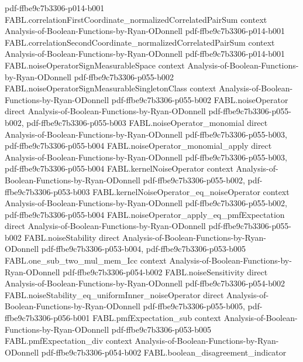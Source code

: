 \begin{theorem}
  {pdf-ffbe9c7b3306-p014-b001}
\proofstep
  {FABL.correlationFirstCoordinate_normalizedCorrelatedPairSum}
  {context}
  {Analysis-of-Boolean-Functions-by-Ryan-ODonnell}
  {pdf-ffbe9c7b3306-p014-b001}
\proofstep
  {FABL.correlationSecondCoordinate_normalizedCorrelatedPairSum}
  {context}
  {Analysis-of-Boolean-Functions-by-Ryan-ODonnell}
  {pdf-ffbe9c7b3306-p014-b001}
\proofstep
  {FABL.noiseOperatorSignMeasurableSpace}
  {context}
  {Analysis-of-Boolean-Functions-by-Ryan-ODonnell}
  {pdf-ffbe9c7b3306-p055-b002}
\proofstep
  {FABL.noiseOperatorSignMeasurableSingletonClass}
  {context}
  {Analysis-of-Boolean-Functions-by-Ryan-ODonnell}
  {pdf-ffbe9c7b3306-p055-b002}
\proofstep
  {FABL.noiseOperator}
  {direct}
  {Analysis-of-Boolean-Functions-by-Ryan-ODonnell}
  {pdf-ffbe9c7b3306-p055-b002,
    pdf-ffbe9c7b3306-p055-b003}
\proofstep
  {FABL.noiseOperator_monomial}
  {direct}
  {Analysis-of-Boolean-Functions-by-Ryan-ODonnell}
  {pdf-ffbe9c7b3306-p055-b003,
    pdf-ffbe9c7b3306-p055-b004}
\proofstep
  {FABL.noiseOperator_monomial_apply}
  {direct}
  {Analysis-of-Boolean-Functions-by-Ryan-ODonnell}
  {pdf-ffbe9c7b3306-p055-b003,
    pdf-ffbe9c7b3306-p055-b004}
\proofstep
  {FABL.kernelNoiseOperator}
  {context}
  {Analysis-of-Boolean-Functions-by-Ryan-ODonnell}
  {pdf-ffbe9c7b3306-p055-b002,
    pdf-ffbe9c7b3306-p053-b003}
\proofstep
  {FABL.kernelNoiseOperator_eq_noiseOperator}
  {context}
  {Analysis-of-Boolean-Functions-by-Ryan-ODonnell}
  {pdf-ffbe9c7b3306-p055-b002,
    pdf-ffbe9c7b3306-p055-b004}
\proofstep
  {FABL.noiseOperator_apply_eq_pmfExpectation}
  {direct}
  {Analysis-of-Boolean-Functions-by-Ryan-ODonnell}
  {pdf-ffbe9c7b3306-p055-b002}
\proofstep
  {FABL.noiseStability}
  {direct}
  {Analysis-of-Boolean-Functions-by-Ryan-ODonnell}
  {pdf-ffbe9c7b3306-p053-b004,
    pdf-ffbe9c7b3306-p053-b005}
\proofstep
  {FABL.one_sub_two_mul_mem_Icc}
  {context}
  {Analysis-of-Boolean-Functions-by-Ryan-ODonnell}
  {pdf-ffbe9c7b3306-p054-b002}
\proofstep
  {FABL.noiseSensitivity}
  {direct}
  {Analysis-of-Boolean-Functions-by-Ryan-ODonnell}
  {pdf-ffbe9c7b3306-p054-b002}
\proofstep
  {FABL.noiseStability_eq_uniformInner_noiseOperator}
  {direct}
  {Analysis-of-Boolean-Functions-by-Ryan-ODonnell}
  {pdf-ffbe9c7b3306-p055-b005,
    pdf-ffbe9c7b3306-p056-b001}
\proofstep
  {FABL.pmfExpectation_sub}
  {context}
  {Analysis-of-Boolean-Functions-by-Ryan-ODonnell}
  {pdf-ffbe9c7b3306-p053-b005}
\proofstep
  {FABL.pmfExpectation_div}
  {context}
  {Analysis-of-Boolean-Functions-by-Ryan-ODonnell}
  {pdf-ffbe9c7b3306-p054-b002}
\proofstep
  {FABL.boolean_disagreement_indicator}

\end{theorem}
